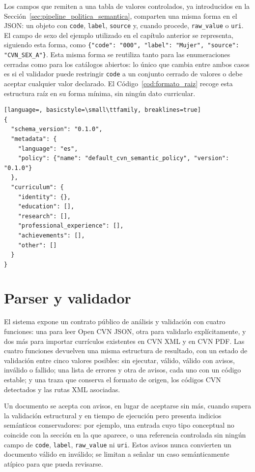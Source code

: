 Los campos que remiten a una tabla de valores controlados, ya introducidos en
la Sección~\ref{sec:pipeline_politica_semantica}, comparten una misma forma
en el JSON: un objeto con \texttt{code}, \texttt{label}, \texttt{source} y,
cuando procede, \texttt{raw\_value} o \texttt{uri}. El campo de sexo del
ejemplo utilizado en el capítulo anterior se representa, siguiendo esta
forma, como \texttt{\{"code": "000", "label": "Mujer", "source":
"CVN\_SEX\_A"\}}. Esta misma forma se reutiliza tanto para las enumeraciones
cerradas como para los catálogos abiertos: lo único que cambia entre ambos
casos es si el validador puede restringir \texttt{code} a un conjunto
cerrado de valores o debe aceptar cualquier valor declarado. El
Código~\ref{cod:formato_raiz} recoge esta estructura raíz en su forma
mínima, sin ningún dato curricular.

\begin{code}[htbp]
\begin{lstlisting}[language=, basicstyle=\small\ttfamily, breaklines=true]
{
  "schema_version": "0.1.0",
  "metadata": {
    "language": "es",
    "policy": {"name": "default_cvn_semantic_policy", "version": "0.1.0"}
  },
  "curriculum": {
    "identity": {},
    "education": [],
    "research": [],
    "professional_experience": [],
    "achievements": [],
    "other": []
  }
}
\end{lstlisting}
\caption{Estructura raíz mínima de un documento Open CVN JSON.}
\label{cod:formato_raiz}
\end{code}

\section{Parser y validador}
\label{sec:formato_parser}

El sistema expone un contrato público de análisis y validación con cuatro
funciones: una para leer Open CVN JSON, otra para validarlo explícitamente,
y dos más para importar currículos existentes en CVN XML y en CVN PDF. Las
cuatro funciones devuelven una misma estructura de resultado, con un estado
de validación entre cinco valores posibles: sin ejecutar, válido, válido con
avisos, inválido o fallido; una lista de errores y otra de avisos, cada uno
con un código estable; y una traza que conserva el formato de origen, los
códigos CVN detectados y las rutas XML asociadas.

Un documento se acepta con avisos, en lugar de aceptarse sin más, cuando
supera la validación estructural y en tiempo de ejecución pero presenta
indicios semánticos conservadores: por ejemplo, una entrada cuyo tipo
conceptual no coincide con la sección en la que aparece, o una referencia
controlada sin ningún campo de \texttt{code}, \texttt{label}, \texttt{raw\_value}
ni \texttt{uri}. Estos avisos nunca convierten un documento válido en
inválido; se limitan a señalar un caso semánticamente atípico para que
pueda revisarse.

